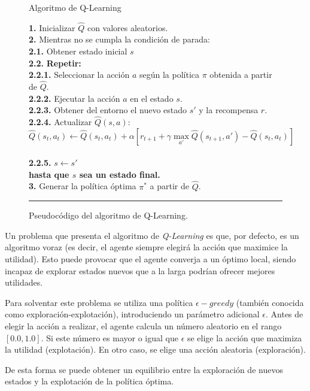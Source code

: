 \begin{figure}[h]
\begin{algorithm}[H]
\caption{Algoritmo de Q-Learning}
\textbf{1.} Inicializar $\hat{Q}$ con valores aleatorios.\\
\textbf{2.} Mientras no se cumpla la condición de parada:\\
\Indp \textbf{2.1.} Obtener estado inicial $s$\\
\textbf{2.2.} \textbf{Repetir:}\\
\Indp \textbf{2.2.1.} Seleccionar la acción $a$ según la política $\pi$ obtenida a partir de $\hat{Q}$.\\
\textbf{2.2.2.} Ejecutar la acción $a$ en el estado $s$.\\
\textbf{2.2.3.} Obtener del entorno el nuevo estado $s'$ y la recompensa $r$.\\
\textbf{2.2.4.} Actualizar $\hat{Q}(s,a)$:\\
\[\hat{Q}(s_t,a_t) \leftarrow \hat{Q}(s_t,a_t) + \alpha [r_{t+1} + \gamma \max_{a'} \hat{Q}(s_{t+1},a') - \hat{Q}(s_t,a_t)]\]\\
\textbf{2.2.5.} $s \leftarrow s'$\\
\Indm \textbf{hasta que $s$ sea un estado final.}\\
\Indm \textbf{3.} Generar la política óptima $\pi^{*}$ a partir de $\hat{Q}$.
\end{algorithm}
\hrule
\caption{Pseudocódigo del algoritmo de Q-Learning.}
\label{alg:chap3-qlearning}
\end{figure}

Un problema que presenta el algoritmo de \textit{Q-Learning} es que, por defecto, es un algoritmo voraz (es decir, el agente siempre elegirá la acción que maximice la utilidad). Esto puede provocar que el agente converja a un óptimo local, siendo incapaz de explorar estados nuevos que a la larga podrían ofrecer mejores utilidades.

Para solventar este problema se utiliza una política $\epsilon-greedy$ \cite{Sutton1998} (también conocida como exploración-explotación), introduciendo un parámetro adicional $\epsilon$. Antes de elegir la acción a realizar, el agente calcula un número aleatorio en el rango $[0.0, 1.0]$. Si este número es mayor o igual que $\epsilon$ se elige la acción que maximiza la utilidad (explotación). En otro caso, se elige una acción aleatoria (exploración). 

De esta forma se puede obtener un equilibrio entre la exploración de nuevos estados y la explotación de la política óptima.


